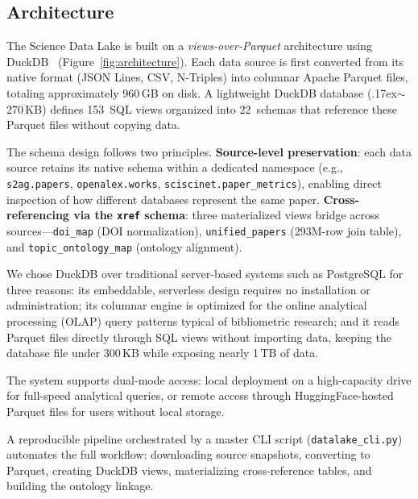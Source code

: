 \subsection{Architecture}
\label{sec:architecture}

The Science Data Lake is built on a \emph{views-over-Parquet} architecture using
DuckDB~\cite{raasveldt2019duckdb} (Figure~\ref{fig:architecture}). Each data source
is first converted from its native format (JSON Lines, CSV, N-Triples) into columnar
Apache Parquet files, totaling approximately 960\,GB on disk. A lightweight DuckDB
database ({\raise.17ex\hbox{$\scriptstyle\sim$}}270\,KB) defines 153~SQL views
organized into 22~schemas that reference these Parquet files without copying data.

The schema design follows two principles. \textbf{Source-level preservation}: each
data source retains its native schema within a dedicated namespace (e.g.,
\texttt{s2ag.papers}, \texttt{openalex.works}, \texttt{sciscinet.paper\_metrics}),
enabling direct inspection of how different databases represent the same paper.
\textbf{Cross-referencing via the \texttt{xref} schema}: three materialized views
bridge across sources---\texttt{doi\_map} (DOI normalization), \texttt{unified\_papers}
(293M-row join table), and \texttt{topic\_ontology\_map} (ontology alignment).

We chose DuckDB over traditional server-based systems such as PostgreSQL for
three reasons: its embeddable, serverless design requires no installation or
administration; its columnar engine is optimized for the online analytical processing (OLAP) query
patterns typical of bibliometric research; and it reads Parquet
files directly through SQL views without importing data, keeping the database
file under 300\,KB while exposing nearly 1\,TB of data.

The system supports dual-mode access: local deployment on a high-capacity drive
for full-speed analytical queries, or remote access through HuggingFace-hosted
Parquet files for users without local storage.

A reproducible pipeline orchestrated by a master CLI script (\texttt{datalake\_cli.py})
automates the full workflow: downloading source snapshots, converting to Parquet,
creating DuckDB views, materializing cross-reference tables, and building the ontology
linkage.



